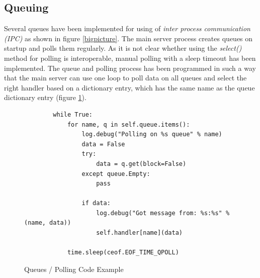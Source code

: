 \subsection{Queuing}
Several queues have been implemented for using of 
\textit{inter process communication (IPC)} as shown in figure \ref{bigpicture}.
The main server process creates queues on startup and polls them regularly.
As it is not clear whether using the \textit{select()} method
for polling is interoperable, manual polling with a sleep timeout has been 
implemented. The queue and polling process
has been programmed in such a way that the main server can use one loop
to poll data on all queues and select the right handler based on
a dictionary entry, which has the same name as the queue dictionary
entry (figure \ref{queuepoll}).
\begin{figure}[htbp]
\caption{Queues / Polling Code Example}
\label{queuepoll}
\begin{verbatim}
        while True:
            for name, q in self.queue.items():
                log.debug("Polling on %s queue" % name)
                data = False
                try:
                    data = q.get(block=False)
                except queue.Empty:
                    pass

                if data:
                    log.debug("Got message from: %s:%s" % (name, data))
                    self.handler[name](data)

            time.sleep(ceof.EOF_TIME_QPOLL)
\end{verbatim}
\end{figure}
